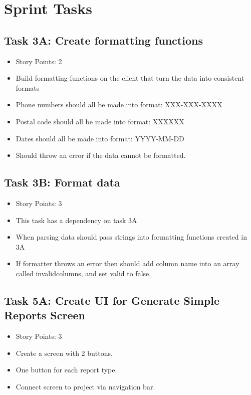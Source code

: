 \documentclass[12pt]{article}
\begin{document}
\textcolor{black}{\tableofcontents}
\pagebreak


\section{Sprint Tasks}

\subsection{Task 3A: Create formatting functions}
\begin{itemize}%
\item Story Points: 2
\item Build formatting functions on the client that turn the data into consistent formats 
\item Phone numbers should all be made into format: XXX-XXX-XXXX
\item Postal code should all be made into format: XXXXXX
\item Dates should all be made into format: YYYY-MM-DD
\item Should throw an error if the data cannot be formatted.
\end{itemize}

\subsection{Task 3B: Format data}
\begin{itemize}%
\item Story Points: 3
\item This task has a dependency on task 3A
\item When parsing data should pass strings into formatting functions created in 3A
\item If formatter throws an error then should add column name into an array called invalidcolumns, and set valid to false.
\end{itemize}

\subsection{Task 5A: Create UI for Generate Simple Reports Screen}
\begin{itemize}%
\item Story Points: 3
\item Create a screen with 2 buttons.
\item One button for each report type. 
\item Connect screen to project via navigation bar.
\end{itemize}
\end{document}
